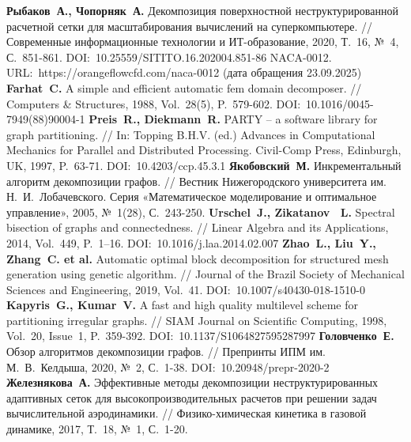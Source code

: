 \begin{thebibliography}{99}
\textbf{Рыбаков~А., Чопорняк~А.} Декомпозиция поверхностной неструктурированной расчетной сетки для масштабирования вычислений на суперкомпьютере. // Современные информационные технологии и ИТ-образование, 2020, Т.~16, №~4, С.~851-861. DOI:~10.25559/SITITO.16.202004.851-86
NACA-0012. URL:~https://orangeflowcfd.com/naca-0012 (дата обращения 23.09.2025)
\textbf{Farhat~C.} A simple and efficient automatic fem domain decomposer. // Computers \& Structures, 1988, Vol.~28(5), P.~579-602. DOI:~10.1016/0045-7949(88)90004-1
\textbf{Preis~R., Diekmann~R.} PARTY -- a software library for graph partitioning. // In: Topping B.H.V. (ed.) Advances in Computational Mechanics for Parallel and Distributed Processing. Civil-Comp Press, Edinburgh, UK, 1997, P.~63-71. DOI:~10.4203/ccp.45.3.1 
\textbf{Якобовский~М.} Инкрементальный алгоритм декомпозиции графов. // Вестник Нижегородского университета им. Н.~И.~Лобачевского. Серия «Математическое моделирование и оптимальное управление», 2005, №~1(28), С.~243-250.
\textbf{Urschel~J., Zikatanov~ L.} Spectral bisection of graphs and connectedness. // Linear Algebra and its Applications, 2014, Vol.~449, P.~1–16. DOI:~10.1016/j.laa.2014.02.007
\textbf{Zhao~L., Liu~Y., Zhang~C. et al.} Automatic optimal block decomposition for structured mesh generation using genetic algorithm. // Journal of the Brazil Society of Mechanical Sciences and Engineering, 2019, Vol.~41. DOI:~10.1007/s40430-018-1510-0
\textbf{Kapyris~G., Kumar~V.} A fast and high quality multilevel scheme for partitioning irregular graphs. // SIAM Journal on Scientific Computing, 1998, Vol.~20, Issue~1, P.~359-392. DOI:~10.1137/S1064827595287997
\textbf{Головченко~Е.} Обзор алгоритмов декомпозиции графов. // Препринты ИПМ им. М.~В.~Келдыша, 2020, №~2, С.~1-38. DOI:~10.20948/prepr-2020-2
\textbf{Железнякова~А.} Эффективные методы декомпозиции неструктурированных адаптивных сеток для высокопроизводительных расчетов при решении задач вычислительной аэродинамики. // Физико-химическая кинетика в газовой динамике, 2017, Т.~18, №~1, С.~1-20.


\end{thebibliography}
